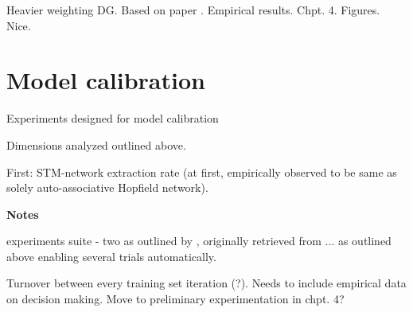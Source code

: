 Heavier weighting DG. Based on paper \citep{Norman2003}. Empirical results. Chpt. 4. Figures. Nice.

\section{Model calibration}

Experiments designed for model calibration

Dimensions analyzed outlined above.

First: STM-network extraction rate (at first, empirically observed to be same as solely auto-associative Hopfield network).


\textbf{Notes}

experiments suite - two as outlined by \citep{Hattori2014}, originally retrieved from ... as outlined above
enabling several trials automatically.

Turnover between every training set iteration (?). Needs to include empirical data on decision making. Move to preliminary experimentation in chpt. 4?

\cleardoublepage